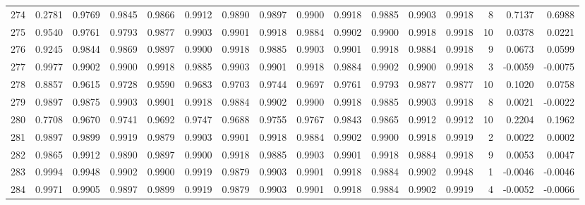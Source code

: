 \begin{tabular}{lrrrrrrrrrrrrrrr}
274 &      0.2781 &  0.9769 &  0.9845 &  0.9866 &  0.9912 &  0.9890 &  0.9897 &  0.9900 &  0.9918 &  0.9885 &   0.9903 &     0.9918 &      8 &                    0.7137 &                     0.6988 \\
275 &      0.9540 &  0.9761 &  0.9793 &  0.9877 &  0.9903 &  0.9901 &  0.9918 &  0.9884 &  0.9902 &  0.9900 &   0.9918 &     0.9918 &     10 &                    0.0378 &                     0.0221 \\
276 &      0.9245 &  0.9844 &  0.9869 &  0.9897 &  0.9900 &  0.9918 &  0.9885 &  0.9903 &  0.9901 &  0.9918 &   0.9884 &     0.9918 &      9 &                    0.0673 &                     0.0599 \\
277 &      0.9977 &  0.9902 &  0.9900 &  0.9918 &  0.9885 &  0.9903 &  0.9901 &  0.9918 &  0.9884 &  0.9902 &   0.9900 &     0.9918 &      3 &                   -0.0059 &                    -0.0075 \\
278 &      0.8857 &  0.9615 &  0.9728 &  0.9590 &  0.9683 &  0.9703 &  0.9744 &  0.9697 &  0.9761 &  0.9793 &   0.9877 &     0.9877 &     10 &                    0.1020 &                     0.0758 \\
279 &      0.9897 &  0.9875 &  0.9903 &  0.9901 &  0.9918 &  0.9884 &  0.9902 &  0.9900 &  0.9918 &  0.9885 &   0.9903 &     0.9918 &      8 &                    0.0021 &                    -0.0022 \\
280 &      0.7708 &  0.9670 &  0.9741 &  0.9692 &  0.9747 &  0.9688 &  0.9755 &  0.9767 &  0.9843 &  0.9865 &   0.9912 &     0.9912 &     10 &                    0.2204 &                     0.1962 \\
281 &      0.9897 &  0.9899 &  0.9919 &  0.9879 &  0.9903 &  0.9901 &  0.9918 &  0.9884 &  0.9902 &  0.9900 &   0.9918 &     0.9919 &      2 &                    0.0022 &                     0.0002 \\
282 &      0.9865 &  0.9912 &  0.9890 &  0.9897 &  0.9900 &  0.9918 &  0.9885 &  0.9903 &  0.9901 &  0.9918 &   0.9884 &     0.9918 &      9 &                    0.0053 &                     0.0047 \\
283 &      0.9994 &  0.9948 &  0.9902 &  0.9900 &  0.9919 &  0.9879 &  0.9903 &  0.9901 &  0.9918 &  0.9884 &   0.9902 &     0.9948 &      1 &                   -0.0046 &                    -0.0046 \\
284 &      0.9971 &  0.9905 &  0.9897 &  0.9899 &  0.9919 &  0.9879 &  0.9903 &  0.9901 &  0.9918 &  0.9884 &   0.9902 &     0.9919 &      4 &                   -0.0052 &                    -0.0066 \\

\end{tabular}
